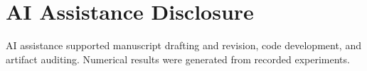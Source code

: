 \documentclass[conference]{IEEEtran}
\begin{document}
\section*{AI Assistance Disclosure}
AI assistance supported manuscript drafting and revision, code development, and artifact auditing. Numerical results were generated from recorded experiments.



\end{document}
